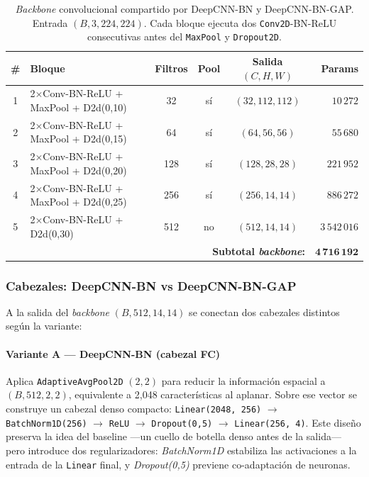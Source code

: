 \begin{table}[!t]
\centering
\caption{\textit{Backbone} convolucional compartido por
DeepCNN-BN y DeepCNN-BN-GAP. Entrada $(B, 3, 224, 224)$.
Cada bloque ejecuta dos \texttt{Conv2D}-BN-ReLU consecutivas
antes del \texttt{MaxPool} y \texttt{Dropout2D}.}
\label{tab:arq-m2-backbone}
\renewcommand{\arraystretch}{1.15}
\setlength{\tabcolsep}{6pt}
\footnotesize
\begin{tabular}{@{}clcccr@{}}
\toprule
\textbf{\#} & \textbf{Bloque} & \textbf{Filtros} &
\textbf{Pool} & \textbf{Salida $(C,H,W)$} & \textbf{Params} \\
\midrule
1 & 2$\times$Conv-BN-ReLU + MaxPool + D2d(0{,}10) & 32  & sí & $(32, 112, 112)$ & $10\,272$ \\
2 & 2$\times$Conv-BN-ReLU + MaxPool + D2d(0{,}15) & 64  & sí & $(64,  56,  56)$ & $55\,680$ \\
3 & 2$\times$Conv-BN-ReLU + MaxPool + D2d(0{,}20) & 128 & sí & $(128, 28,  28)$ & $221\,952$ \\
4 & 2$\times$Conv-BN-ReLU + MaxPool + D2d(0{,}25) & 256 & sí & $(256, 14,  14)$ & $886\,272$ \\
5 & 2$\times$Conv-BN-ReLU + D2d(0{,}30)           & 512 & no & $(512, 14,  14)$ & $3\,542\,016$ \\
\midrule
\multicolumn{5}{r}{\textbf{Subtotal \textit{backbone}:}} & $\mathbf{4\,716\,192}$ \\
\bottomrule
\end{tabular}
\end{table}

\subsubsection*{Cabezales: DeepCNN-BN vs DeepCNN-BN-GAP}

A la salida del \textit{backbone} $(B, 512, 14, 14)$ se conectan
dos cabezales distintos según la variante:

\paragraph*{Variante A --- DeepCNN-BN (cabezal FC)}
Aplica \texttt{AdaptiveAvgPool2D} $(2, 2)$ para reducir la
información espacial a $(B, 512, 2, 2)$, equivalente a 2{,}048
características al aplanar. Sobre ese vector se construye un
cabezal denso compacto: \texttt{Linear(2048, 256)} $\to$
\texttt{BatchNorm1D(256)} $\to$ \texttt{ReLU} $\to$
\texttt{Dropout(0{,}5)} $\to$ \texttt{Linear(256, 4)}. Este
diseño preserva la idea del baseline ---un cuello de botella
denso antes de la salida--- pero introduce dos regularizadores:
\textit{BatchNorm1D} estabiliza las activaciones a la entrada
de la \texttt{Linear} final, y \textit{Dropout(0{,}5)} previene
co-adaptación de neuronas.

